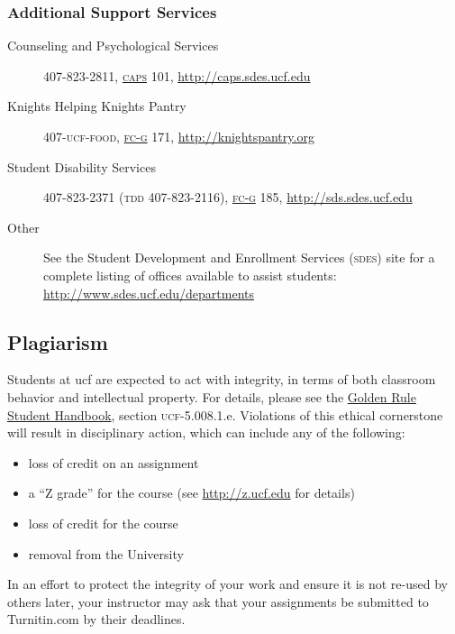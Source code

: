 \documentclass[11pt, twosides]{amsart}	%
\begin{document}
\subsubsection{Additional Support Services} %
\label{ssub:other_support_services}
\begin{description}
	\item [Counseling and Psychological Services] 407-823-2811, \href{http://map.ucf.edu/locations/27/counseling-center-caps/}{\textsc{caps}} 101, \href{http://caps.sdes.ucf.edu}{http://caps.sdes.ucf.edu}
	\item [Knights Helping Knights Pantry] 407-\textsc{ucf-food}, \href{http://map.ucf.edu/locations/7g/ferrell-commons-g-fc-g/}{\textsc{fc-g}} 171, \href{http://knightspantry.org}{http://knightspantry.org}
	\item [Student Disability Services] 407-823-2371 (\textsc{tdd} 407-823-2116), \href{http://map.ucf.edu/locations/7g/ferrell-commons-g-fc-g/}{\textsc{fc-g}} 185, \href{http://sds.sdes.ucf.edu}{http://sds.sdes.ucf.edu}
	\item [Other] See the Student Development and Enrollment Services (\textsc{sdes}) site for a complete listing of offices available to assist students:  \href{http://www.sdes.ucf.edu/departments}{http://www.sdes.ucf.edu/departments}
\end{description}


\subsection{Plagiarism}
Students at \ac{ucf} are expected to act with integrity, in terms of both classroom behavior and intellectual property.  For details, please see the \href{http://www.goldenrule.sdes.ucf.edu}{Golden Rule Student Handbook}, section \textsc{ucf}-5.008.1.e.  Violations of this ethical cornerstone will result in disciplinary action, which can include any of the following:
\begin{itemize}
	\item loss of credit on an assignment
	\item a ``Z grade'' for the course (see \href{http://z.ucf.edu}{http://z.ucf.edu} for details)
	\item loss of credit for the course
	\item removal from the University
\end{itemize}
In an effort to protect the integrity of your work and ensure it is not re-used by others later, your instructor may ask that your assignments be submitted to Turnitin.com by their deadlines.
\end{document}
